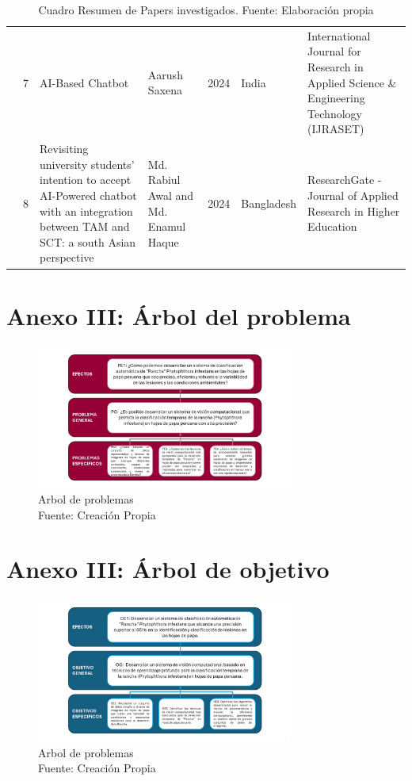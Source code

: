 \begin{table}[h]
\begin{tabular}{|m{0.5cm}|m{0.3cm}|m{4cm}|m{2cm}|m{0.6cm}|m{1.7cm}|m{3cm}|}
		& 7        
		& AI-Based Chatbot
		& Aarush Saxena
		& 2024
		& India
		& International Journal for Research in Applied Science \& Engineering Technology (IJRASET) \\ 

		\cline{2-7}

		& 8        
		& Revisiting university students’ intention to accept AI-Powered chatbot with an integration between TAM and SCT: a south Asian perspective
		& Md. Rabiul Awal and Md. Enamul Haque
		& 2024
		& Bangladesh
		& ResearchGate - Journal of Applied Research in
		Higher Education \\ 
		\hline
	\end{tabular}
	\caption{Cuadro Resumen de Papers investigados. Fuente: Elaboración propia}
\label{A:table}
\end{table}


\chapter{Anexo III: Árbol del problema}

\begin{figure}[h]
	\begin{center}
		\includegraphics[width=0.75\textwidth]{anexos/arbol_problema.jpg}
		\caption{Arbol de problemas 
		\\Fuente: Creación Propia}
		\label{anexos:arbol_problema}
	\end{center}
\end{figure}

\chapter{Anexo III: Árbol de objetivo}

\begin{figure}[h]
	\begin{center}
		\includegraphics[width=0.75\textwidth]{anexos/arbol_objetivos.jpg}
		\caption{Arbol de problemas 
			\\Fuente: Creación Propia}
		\label{anexos:arbol_objetivo}
	\end{center}
\end{figure}
